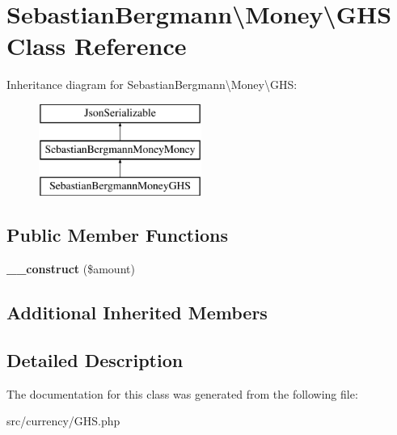 \hypertarget{classSebastianBergmann_1_1Money_1_1GHS}{}\section{Sebastian\+Bergmann\textbackslash{}Money\textbackslash{}G\+H\+S Class Reference}
\label{classSebastianBergmann_1_1Money_1_1GHS}
Inheritance diagram for Sebastian\+Bergmann\textbackslash{}Money\textbackslash{}G\+H\+S\+:\begin{figure}[H]
\begin{center}
\leavevmode
\includegraphics[height=3.000000cm]{classSebastianBergmann_1_1Money_1_1GHS}
\end{center}
\end{figure}
\subsection*{Public Member Functions}
\begin{DoxyCompactItemize}
\item 
\hypertarget{classSebastianBergmann_1_1Money_1_1GHS_a1b76de1f8f9f2fb8d8922a808f4aff98}{}{\bfseries \+\_\+\+\_\+construct} (\$amount)\label{classSebastianBergmann_1_1Money_1_1GHS_a1b76de1f8f9f2fb8d8922a808f4aff98}

\end{DoxyCompactItemize}
\subsection*{Additional Inherited Members}


\subsection{Detailed Description}


The documentation for this class was generated from the following file\+:\begin{DoxyCompactItemize}
\item 
src/currency/G\+H\+S.\+php\end{DoxyCompactItemize}
